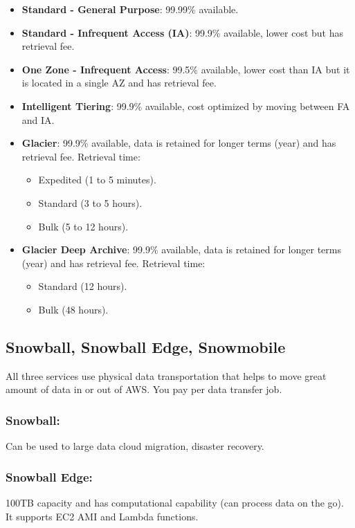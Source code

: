 \begin{itemize}
	\item{\textbf{Standard - General Purpose}: 99.99\% available.}
	\item{\textbf{Standard - Infrequent Access (IA)}: 99.9\% available, lower cost but has retrieval fee.}
	\item{\textbf{One Zone - Infrequent Access}: 99.5\% available, lower cost than IA but it is located in a single AZ and has retrieval fee.}
	\item{\textbf{Intelligent Tiering}: 99.9\% available, cost optimized by moving between FA and IA.}
	\item{\textbf{Glacier}: 99.9\% available, data is retained for longer terms (year) and has retrieval fee. Retrieval time:}
	\begin{itemize}
		\item{Expedited (1 to 5 minutes).}
		\item{Standard (3 to 5 hours).}
		\item{Bulk (5 to 12 hours).}
	\end{itemize}
	\item{\textbf{Glacier Deep Archive}: 99.9\% available, data is retained for longer terms (year) and has retrieval fee. Retrieval time:}
	\begin{itemize}
		\item{Standard (12 hours).}
		\item{Bulk (48 hours).}
	\end{itemize}
\end{itemize}

\subsection{Snowball, Snowball Edge, Snowmobile}\label{subsec:snowball-snowball-edge-snowmobile}
All three services use physical data transportation that helps to move great amount of data in or out of AWS. You pay per data transfer job.

\subsubsection{Snowball:} Can be used to large data cloud migration, disaster recovery.
\subsubsection{Snowball Edge:} 100TB capacity and has computational capability (can process data on the go).
It supports EC2 AMI and Lambda functions.
